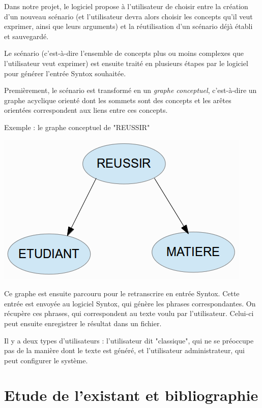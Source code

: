 \documentclass[12pt]{report}
\begin{document}
\bigskip

Dans notre projet, le logiciel propose à l'utilisateur de choisir entre la création d'un nouveau scénario (et l'utilisateur devra alors choisir les concepts qu'il veut exprimer, ainsi que leurs arguments) et la réutilisation d'un scénario déjà établi et sauvegardé.

\bigskip

Le scénario (c'est-à-dire l'ensemble de concepts plus ou moins complexes que l'utilisateur veut exprimer) est ensuite traité en plusieurs étapes par le logiciel pour générer l'entrée Syntox souhaitée.

Premièrement, le scénario est transformé en un \emph{graphe conceptuel}, c'est-à-dire un graphe acyclique orienté dont les sommets sont des concepts et les arêtes orientées correspondent aux liens entre ces concepts.

Exemple : le graphe conceptuel de "REUSSIR"
\begin{center}
	\includegraphics[scale=0.5]{Reussir_graphe.png}
\end{center}

Ce graphe est ensuite parcouru pour le retranscrire en entrée Syntox.
Cette entrée est envoyée au logiciel Syntox, qui génère les phrases correspondantes. On récupère ces phrases, qui correspondent au texte voulu par l'utilisateur. 
Celui-ci peut ensuite enregistrer le résultat dans un fichier.

\bigskip

Il y a deux types d'utilisateurs : l'utilisateur dit "classique", qui ne se préoccupe pas de la manière dont le texte est généré, et l'utilisateur administrateur, qui peut configurer le système.


\chapter{Etude de l'existant et bibliographie}
\end{document}
